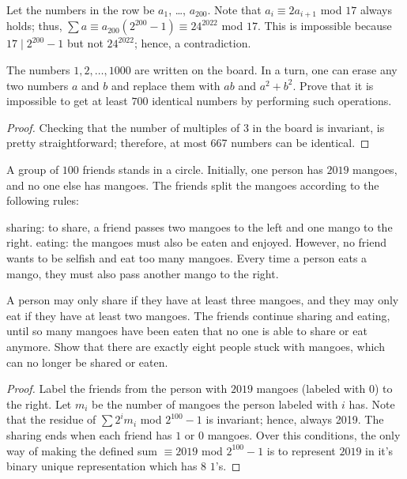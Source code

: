   Let the numbers in the row be $a_1$, \dots, $a_{200}$. 
  Note that $a_i \equiv 2 a_{i+1}$ mod $17$ always holds; thus, 
  $\sum a \equiv a_{200} (2^{200}-1) \equiv 24^{2022}$ mod $17$. 
  This is impossible because $17 \mid 2^{200}-1$ but not $24^{2022}$; 
  hence, a contradiction.

\begin{problem}[$3\clubsuit$]
  The numbers $1, 2, \dots, 1000$ are written on the board.
  In a turn, one can erase any two numbers $a$ and $b$
  and replace them with $ab$ and $a^2+b^2$.
  Prove that it is impossible to get at least $700$
  identical numbers by performing such operations.
\end{problem}

\begin{proof}
  Checking that the number of multiples of $3$ in the board 
  is invariant, is pretty straightforward; therefore, at most 
  667 numbers can be identical.
\end{proof}

\begin{problem}
  A group of $100$ friends stands in a circle.
  Initially, one person has $2019$ mangoes, and no one else has mangoes.
  The friends split the mangoes according to the following rules:
  \begin{itemize}
  \ii sharing: to share, a friend passes two mangoes to the left
  and one mango to the right.
  \ii eating: the mangoes must also be eaten and enjoyed.
  However, no friend wants to be selfish and eat too many mangoes.
  Every time a person eats a mango, they must also pass another mango to the right.
  \end{itemize}
  A person may only share if they have at least three mangoes,
  and they may only eat if they have at least two mangoes.
  The friends continue sharing and eating,
  until so many mangoes have been eaten that no one is able to share or eat anymore.
  Show that there are exactly eight people stuck with mangoes,
  which can no longer be shared or eaten.
\end{problem} 

\begin{proof}
  Label the friends from the person with $2019$ mangoes 
  (labeled  with $0$) to the right. Let $m_i$ be the number of 
  mangoes the person labeled with $i$ has. Note that the residue 
  of $\sum 2^im_i$ mod $2^{100} - 1$ is invariant; hence, always 
  2019. The sharing ends when each friend has $1$ or $0$ mangoes. 
  Over this conditions, the only way of making the defined sum 
  $\equiv 2019$ mod $2^{100}-1$ is to represent $2019$ in it's 
  binary unique representation which has $8$ $1$'s.
\end{proof}

